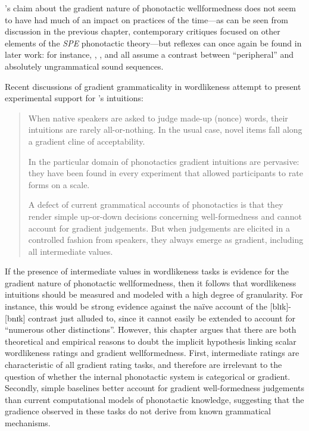 \citeauthor{SPE}'s claim about the gradient nature of phonotactic wellformedness does not seem to have had much of an impact on practices of the time---as can be seen from discussion in the previous chapter, contemporary critiques focused on other elements of the \emph{SPE} phonotactic theory---but reflexes can once again be found in later work: for instance, \citet{Borowsky1989}, \citet[50f.]{Clements1983}, and \citet{Myers1987} all assume a contrast between ``peripheral'' and absolutely ungrammatical sound sequences.

Recent discussions of gradient grammaticality in wordlikeness attempt to present experimental support for \citeauthor{SPE}'s intuitions:

\begin{quote}
When native speakers are asked to judge made-up (nonce) words, their intuitions are rarely all-or-nothing. 
In the usual case, novel items fall along a gradient cline of acceptability. \citep[][9]{Albright2009a}

In the particular domain of phonotactics gradient intuitions are pervasive: they have been found in every experiment that allowed participants to rate forms on a scale.
\citep[][382]{Hayes2008a}

A defect of current grammatical accounts of phonotactics is that they render simple up-or-down decisions concerning well-formedness and cannot account for gradient judgements. But when judgements are elicited in a controlled fashion from speakers, they always emerge as gradient, including all intermediate values. \citep[371]{Shademan2006}
\end{quote}

If the presence of intermediate values in wordlikeness tasks is evidence for the gradient nature of phonotactic wellformedness, then it follows that wordlikeness intuitions should be measured and modeled with a high degree of granularity.
For instance, this would be strong evidence against the naïve account of the [blɪk]-[bnɪk] contrast just alluded to, since it cannot easily be extended to account for ``numerous other distinctions''.
However, this chapter argues that there are both theoretical and empirical reasons to doubt the implicit hypothesis linking scalar wordlikeness ratings and gradient wellformedness.
First, intermediate ratings are characteristic of all gradient rating tasks, and therefore are irrelevant to the question of whether the internal phonotactic system is categorical or gradient.
Secondly, simple baselines better account for gradient well-formedness judgements than current computational models of phonotactic knowledge, suggesting that the gradience observed in these tasks do not derive from known grammatical mechanisms.

